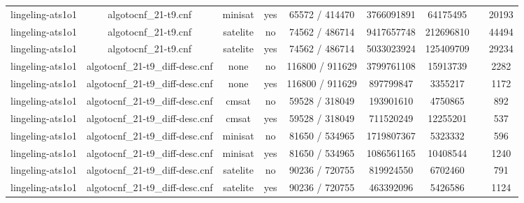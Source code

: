 \begin{appendices}
\begin{table}[p]
\begin{center}
\begin{tabular}{l|cccccccc}
  lingeling-ats1o1               & algotocnf\_21-t9.cnf           & minisat    & yes   & 65572 / 414470 & 3766091891 & 64175495  &            & 20193 \\ %
  lingeling-ats1o1               & algotocnf\_21-t9.cnf           & satelite   & no    & 74562 / 486714 & 9417657748 & 212696810 &            & 44494 \\ %
  lingeling-ats1o1               & algotocnf\_21-t9.cnf           & satelite   & yes   & 74562 / 486714 & 5033023924 & 125409709 &            & 29234 \\ %
  lingeling-ats1o1               & algotocnf\_21-t9\_diff-desc.cnf & none       & no    & 116800 / 911629 & 3799761108 & 15913739  &            & 2282 \\ %
  lingeling-ats1o1               & algotocnf\_21-t9\_diff-desc.cnf & none       & yes   & 116800 / 911629 & 897799847 & 3355217   &            & 1172 \\ %
  lingeling-ats1o1               & algotocnf\_21-t9\_diff-desc.cnf & cmsat      & no    & 59528 / 318049 & 193901610 & 4750865   &            & 892 \\ %
  lingeling-ats1o1               & algotocnf\_21-t9\_diff-desc.cnf & cmsat      & yes   & 59528 / 318049 & 711520249 & 12255201  &            & 537 \\ %
  lingeling-ats1o1               & algotocnf\_21-t9\_diff-desc.cnf & minisat    & no    & 81650 / 534965 & 1719807367 & 5323332   &            & 596 \\ %
  lingeling-ats1o1               & algotocnf\_21-t9\_diff-desc.cnf & minisat    & yes   & 81650 / 534965 & 1086561165 & 10408544  &            & 1240 \\ %
  lingeling-ats1o1               & algotocnf\_21-t9\_diff-desc.cnf & satelite   & no    & 90236 / 720755 & 819924550 & 6702460   &            & 791 \\ %
  lingeling-ats1o1               & algotocnf\_21-t9\_diff-desc.cnf & satelite   & yes   & 90236 / 720755 & 463392096 & 5426586   &            & 1124 \\ %

\end{tabular}
\end{center}
\end{table}
\end{appendices}
